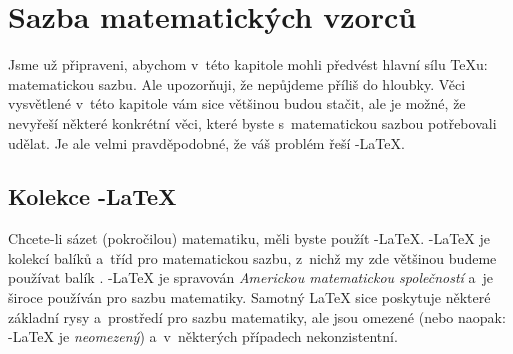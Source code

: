 %
%
%
%
 
\chapter{Sazba matematických vzorců}

\begin{intro}
  Jsme už připraveni, abychom v~této kapitole mohli předvést hlavní sílu
  \TeX u: matematickou sazbu. Ale upozorňuji, že nepůjdeme
  příliš do hloubky. Věci vysvětlené v~této kapitole vám sice většinou budou
  stačit, ale je možné, že nevyřeší některé konkrétní věci, které byste
  s~matematickou sazbou potřebovali udělat. Je ale velmi pravděpodobné,
  že váš problém řeší \AmS-\LaTeX.
\end{intro}

\section{Kolekce \texorpdfstring{\AmS}{AMS}-\LaTeX{}}

Chcete-li sázet (pokročilou) matematiku, měli byste použít
\AmS-\LaTeX{}. \AmS-\LaTeX{} je kolekcí balíků
a~tříd pro matematickou sazbu, z~nichž my zde většinou budeme používat
balík . \AmS-\LaTeX{} je spravován
\emph{Americkou matematickou společností} a~je široce používán
pro sazbu matematiky. Samotný \LaTeX{} sice poskytuje některé základní
rysy a~prostředí pro sazbu matematiky, ale
jsou omezené (nebo naopak: \AmS-\LaTeX{} je \emph{neomezený})
a~v~některých případech nekonzistentní.

